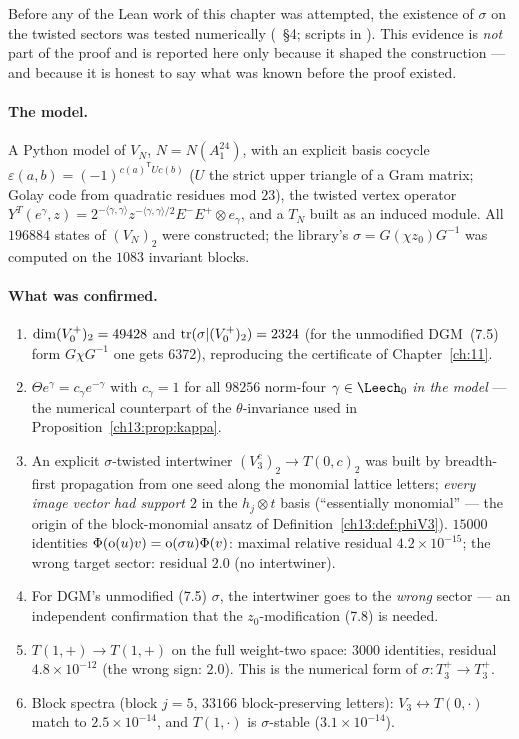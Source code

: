 Before any of the Lean work of this chapter was attempted, the existence of $\sigma$ on the twisted
sectors was tested numerically (~\S4; scripts in
). This evidence is \emph{not} part of the proof and is
reported here only because it shaped the construction --- and because it is honest to say what was known
before the proof existed.

\paragraph{The model.} A Python model of $V_N$, $N=N(A_1^{24})$, with an explicit basis cocycle
$\varepsilon(a,b)=(-1)^{c(a)^{\mathsf T}Uc(b)}$ ($U$ the strict upper triangle of a Gram matrix; Golay code from
quadratic residues mod $23$), the twisted vertex operator $Y^T(e^\gamma,z)=2^{-\langle\gamma,\gamma\rangle}z^{-\langle\gamma,\gamma\rangle/2}
E^-E^+\otimes e_\gamma$, and a $T_N$ built as an induced module. All $196884$ states of $(V_N)_2$ were
constructed; the library's $\sigma=G(\chi z_0)G^{-1}$ was computed on the $1083$ invariant blocks.

\paragraph{What was confirmed.}
\begin{enumerate}
\item $\dim(V_0^{+})_2=49428$ and $\operatorname{tr}(\sigma|(V_0^{+})_2)=2324$ (for the unmodified DGM~(7.5) form
  $G\chi G^{-1}$ one gets $6372$), reproducing the certificate of Chapter~\ref{ch:11}.
\item $\Theta e^\gamma=c_\gamma e^{-\gamma}$ with $c_\gamma=1$ for all $98256$ norm-four $\gamma\in\Leech_0$ \emph{in the model} --- the
  numerical counterpart of the $\theta$-invariance used in Proposition~\ref{ch13:prop:kappa}.
\item An explicit $\sigma$-twisted intertwiner $(V_3^c)_2\to T(0,c)_2$ was built by breadth-first propagation
  from one seed along the monomial lattice letters; \emph{every image vector had support $2$} in the
  $h_j\otimes t$ basis (``essentially monomial'' --- the origin of the block-monomial ansatz of
  Definition~\ref{ch13:def:phiV3}). $15000$ identities $\Phi(\operatorname{o}(u)v)=\operatorname{o}(\sigma u)\Phi(v)$: maximal
  relative residual $4.2\times10^{-15}$; the wrong target sector: residual $2.0$ (no intertwiner).
\item For DGM's unmodified (7.5) $\sigma$, the intertwiner goes to the \emph{wrong} sector --- an independent
  confirmation that the $z_0$-modification (7.8) is needed.
\item $T(1,+)\to T(1,+)$ on the full weight-two space: $3000$ identities, residual $4.8\times10^{-12}$
  (the wrong sign: $2.0$). This is the numerical form of $\sigma\colon T_3^+\to T_3^+$.
\item Block spectra (block $j=5$, $33166$ block-preserving letters): $V_3\leftrightarrow T(0,\cdot)$ match to
  $2.5\times10^{-14}$, and $T(1,\cdot)$ is $\sigma$-stable ($3.1\times10^{-14}$).
\end{enumerate}
